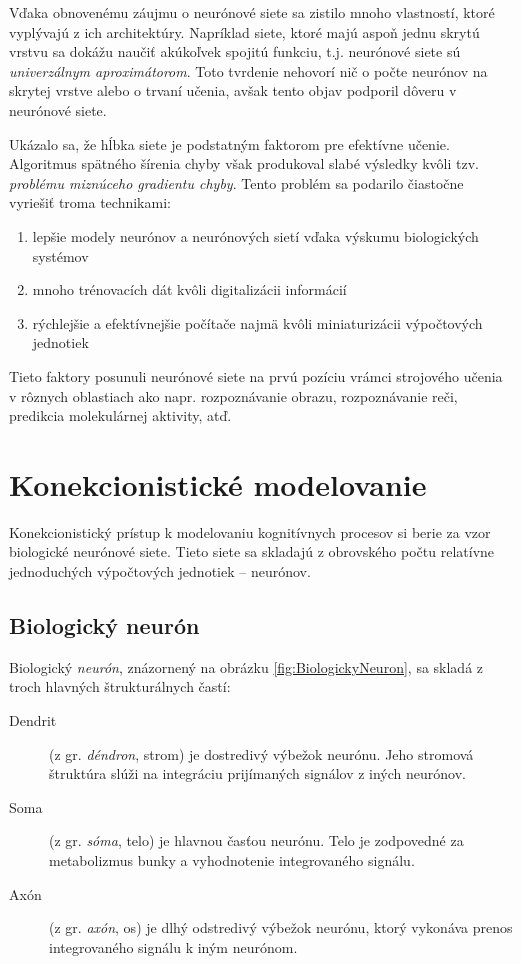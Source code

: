 Vďaka obnovenému záujmu o neurónové siete sa zistilo mnoho vlastností, ktoré vyplývajú z ich architektúry. Napríklad siete, ktoré majú aspoň jednu skrytú vrstvu sa dokážu naučiť akúkoľvek spojitú funkciu, t.j. neurónové siete sú \emph{univerzálnym aproximátorom}.\autocite{Cybenko1989} Toto tvrdenie nehovorí nič o počte neurónov na skrytej vrstve alebo o trvaní učenia, avšak tento objav podporil dôveru v neurónové siete.

Ukázalo sa, že hĺbka siete je podstatným faktorom pre efektívne učenie. Algoritmus spätného šírenia chyby však produkoval slabé výsledky kvôli tzv. \emph{problému miznúceho gradientu chyby}.\autocite{Bengio1994} Tento problém sa podarilo čiastočne vyriešiť troma technikami:
\begin{enumerate}
  \item lepšie modely neurónov a neurónových sietí vďaka výskumu biologických systémov
  \item mnoho trénovacích dát kvôli digitalizácii informácií
  \item rýchlejšie a efektívnejšie počítače najmä kvôli miniaturizácii výpočtových jednotiek
\end{enumerate}

Tieto faktory posunuli neurónové siete na prvú pozíciu vrámci strojového učenia v rôznych oblastiach ako napr. rozpoznávanie obrazu, rozpoznávanie reči, predikcia molekulárnej aktivity, atď.\autocite{Schmidhuber2014}


\chapter{Konekcionistické modelovanie}

Konekcionistický prístup k modelovaniu kognitívnych procesov si berie za vzor biologické neurónové siete. Tieto siete sa skladajú z obrovského počtu relatívne jednoduchých výpočtových jednotiek -- neurónov.

\section{Biologický neurón}

Biologický \emph{neurón}, znázornený na obrázku \ref{fig:BiologickyNeuron}, sa skladá z troch hlavných štrukturálnych častí:
\begin{description}
  \item[Dendrit] (z gr. \emph{déndron}, strom) je dostredivý výbežok neurónu. Jeho stromová štruktúra slúži na integráciu prijímaných signálov z iných neurónov.
  \item[Soma] (z gr. \emph{sóma}, telo) je hlavnou časťou neurónu. Telo je zodpovedné za metabolizmus bunky a vyhodnotenie integrovaného signálu.
  \item[Axón] (z gr. \emph{axón}, os) je dlhý odstredivý výbežok neurónu, ktorý vykonáva prenos integrovaného signálu k iným neurónom.
\end{description}

